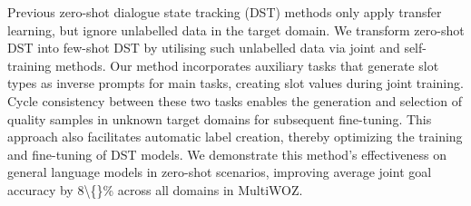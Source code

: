 Previous zero-shot dialogue state tracking (DST) methods only apply transfer learning, but ignore unlabelled data in the target domain. We transform zero-shot DST into few-shot DST by utilising such unlabelled data via joint and self-training methods. Our method incorporates auxiliary tasks that generate slot types as inverse prompts for main tasks, creating slot values during joint training.  Cycle consistency between these two tasks enables the generation and selection of quality samples in unknown target domains for subsequent fine-tuning. This approach also facilitates automatic label creation, thereby optimizing the training and fine-tuning of DST models. We demonstrate this method's effectiveness on general language models in zero-shot scenarios, improving average joint goal accuracy by 8\textbackslash\{\}\% across all domains in MultiWOZ.